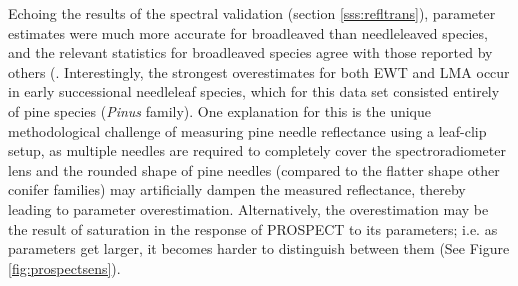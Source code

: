 {Echoing the results of the spectral validation (section \ref{sss:refltrans}),
parameter estimates were much more accurate for broadleaved than needleleaved
species, and the relevant statistics for broadleaved species agree with those
reported by others (\cite{Feret2008, Li2011a}.  Interestingly, the strongest
overestimates for both EWT and LMA occur in early successional needleleaf
species, which for this data set consisted entirely of pine species
(\textit{Pinus} family). One explanation for this is the unique methodological
challenge of measuring pine needle reflectance using a leaf-clip setup, as
multiple needles are required to completely cover the spectroradiometer lens
and the rounded shape of pine needles (compared to the flatter shape other
conifer families) may artificially dampen the measured reflectance, thereby
leading to parameter overestimation. Alternatively, the overestimation may be
the result of saturation in the response of PROSPECT to its parameters; i.e.
as parameters get larger, it becomes harder to distinguish between them (See
Figure \ref{fig:prospectsens}).  

}
